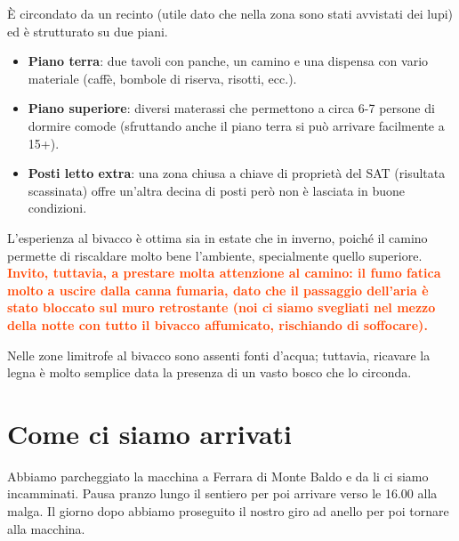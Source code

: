 \documentclass{article}
\begin{document}
È circondato da un recinto (utile dato che nella zona sono stati avvistati dei lupi) ed è strutturato su due piani.
\begin{itemize}
    \item \textbf{Piano terra}: due tavoli con panche, un camino e una dispensa con vario materiale (caffè, bombole di riserva, risotti, ecc.).
    \item \textbf{Piano superiore}: diversi materassi che permettono a circa 6-7 persone di dormire comode (sfruttando anche il piano terra si può arrivare facilmente a 15+).
    \item \textbf{Posti letto extra}: una zona chiusa a chiave di proprietà del SAT (risultata scassinata) offre un'altra decina di posti però non è lasciata in buone condizioni.
\end{itemize}

L'esperienza al bivacco è ottima sia in estate che in inverno, poiché il camino permette di riscaldare molto bene l'ambiente, specialmente quello superiore. \textbf{\textcolor{OrangeRed}{Invito, tuttavia, a prestare molta attenzione al camino: il fumo fatica molto a uscire dalla canna fumaria, dato che il passaggio dell'aria è stato bloccato sul muro retrostante (noi ci siamo svegliati nel mezzo della notte con tutto il bivacco affumicato, rischiando di soffocare).}}

Nelle zone limitrofe al bivacco sono assenti fonti d'acqua; tuttavia, ricavare la legna è molto semplice data la presenza di un vasto bosco che lo circonda.

\section{Come ci siamo arrivati}
Abbiamo parcheggiato la macchina a Ferrara di Monte Baldo e da li ci siamo incamminati. Pausa pranzo lungo il sentiero per poi arrivare verso le 16.00 alla malga. Il giorno dopo abbiamo proseguito il nostro giro ad anello per poi tornare alla macchina.
\end{document}
